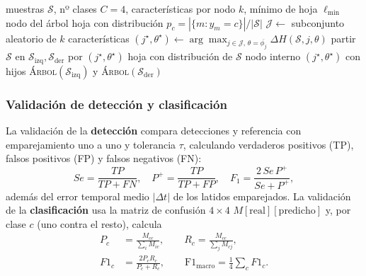 \begin{algorithm}[t]
\small
\caption{Entrenamiento de un árbol del bosque (nodo $\mathcal{S}$)}
\label{alg:arbol}
\begin{algorithmic}[1]
\Require muestras $\mathcal{S}$, nº clases $C{=}4$, características por nodo $k$, mínimo de hoja $\ell_{\min}$
\Ensure nodo del árbol
  \State \Return hoja con distribución $p_c=|\{m:y_m=c\}|/|\mathcal{S}|$
\EndIf
\State $\mathcal{J}\leftarrow$ subconjunto aleatorio de $k$ características
\State $(j^\star,\theta^\star)\leftarrow\arg\max_{j\in\mathcal{J},\,\theta=\overline{\phi_j}}\Delta H(\mathcal{S},j,\theta)$
\State partir $\mathcal{S}$ en $\mathcal{S}_{\mathrm{izq}},\mathcal{S}_{\mathrm{der}}$ por $(j^\star,\theta^\star)$
  \State \Return hoja con distribución de $\mathcal{S}$
\EndIf
\State \Return nodo interno $(j^\star,\theta^\star)$ con hijos
  \textsc{Árbol}$(\mathcal{S}_{\mathrm{izq}})$ y \textsc{Árbol}$(\mathcal{S}_{\mathrm{der}})$
\end{algorithmic}
\end{algorithm}

\subsubsection{Validación de detección y clasificación}

La validación de la \textbf{detección} compara detecciones y referencia con emparejamiento uno a uno y tolerancia $\tau$, calculando verdaderos positivos (TP), falsos positivos (FP) y falsos negativos (FN):
\begin{equation}
Se=\frac{TP}{TP+FN},\quad P^{+}=\frac{TP}{TP+FP},\quad F_1=\frac{2\,Se\,P^{+}}{Se+P^{+}},
\end{equation}
además del error temporal medio $|\Delta t|$ de los latidos emparejados. La validación de la \textbf{clasificación} usa la matriz de confusión $4\times4$ $M[\text{real}][\text{predicho}]$ y, por clase $c$ (uno contra el resto), calcula
\begin{align}
P_c&=\frac{M_{cc}}{\sum_i M_{ic}},\qquad
R_c=\frac{M_{cc}}{\sum_j M_{cj}},\\
F1_c&=\frac{2P_cR_c}{P_c+R_c},\qquad
\text{F1}_{\text{macro}}=\frac14\sum_c F1_c.
\end{align}


